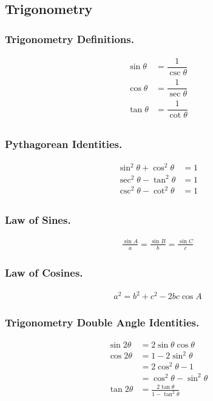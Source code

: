 \documentclass[../../../main.tex]{subfiles}
\begin{document}
\subsection{Trigonometry}
\subsubsection{Trigonometry Definitions.}
\begin{align*}
    \sin \theta&=\dfrac{1}{\csc \theta}\\
    \cos \theta&=\dfrac{1}{\sec \theta}\\
    \tan \theta&=\dfrac{1}{\cot \theta}\\
\end{align*}

\subsubsection{Pythagorean Identities.}
\begin{align*}
    \sin^2 \theta+ \cos^2 \theta &=1\\
    \sec^2 \theta- \tan^2 \theta &=1\\
    \csc^2 \theta- \cot^2 \theta &=1\\
\end{align*}

\subsubsection{Law of Sines.}
\begin{align*}
    \frac{\sin A}{a}=\frac{\sin B}{b}=\frac{\sin C}{c}
\end{align*}

\subsubsection{Law of Cosines.}
\begin{align*}
    a^2=b^2+c^2-2bc\cos A
\end{align*}

\subsubsection{Trigonometry Double Angle Identities.}
\begin{align*}
    \sin 2\theta&=2\sin \theta \cos \theta\\
    \cos 2 \theta&=1-2\sin^2\theta\\
    &=2\cos^2\theta -1\\
    &=\cos^2\theta-\sin^2\theta\\
    \tan 2\theta&=\frac{2\tan\theta}{1-\tan^2\theta}
\end{align*}
\end{document}
